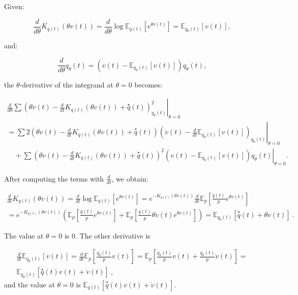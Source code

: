 \documentclass[axioms,article,submit,pdftex,moreauthors]{Definitions/mdpi}
\theoremstyle{plain}
\theoremstyle{remark}
\begin{document}
Given:

\begin{equation*} 
\frac{d}{d\theta} K_{q(t)}(\theta v(t)) = \frac{d}{d\theta} \log \mathbb{E}_{q(t)} \left[ e^{\theta v(t)} \right] = \mathbb{E}_{q_\theta(t)} [v(t)],
\end{equation*} 

and:

\begin{equation*} 
\frac{d}{d\theta} q_\theta(t) = (v(t) - \mathbb{E}_{q_\theta(t)} [v(t)]) q_\theta(t),
\end{equation*} 

the \(\theta\)-derivative of the integrand at \(\theta = 0\) becomes:

\begin{multline*}
\left. \frac{d}{d\theta} \sum \left( \theta \dot{v}(t) - \frac{d}{dt} K_{q(t)}(\theta v(t)) + \overset{\star}{q}(t) \right)^2_{q_\theta(t)} \right|_{\theta=0} \\
= \left. \sum 2 \left( \theta \dot{v}(t) - \frac{d}{dt} K_{q(t)}(\theta v(t)) + \overset{\star}{q}(t) \right) \left( \dot{v}(t) - \frac{d}{dt} \mathbb{E}_{q_\theta(t)} [v(t)] \right)_{q_\theta(t)} \right|_{\theta=0} \\
\quad + \left. \sum \left( \theta \dot{v}(t) - \frac{d}{dt} K_{q(t)}(\theta v(t)) + \overset{\star}{q}(t) \right)^2 (v(t) - \mathbb{E}_{q_\theta(t)} [v(t)]) q_\theta(t) \right|_{\theta=0}.
\end{multline*}

After computing the terms with \(\frac{d}{dt}\), we obtain:

\begin{multline*}  
    \frac{d}{dt} K_{q(t)}(\theta v(t)) = \frac{d}{dt} \log \mathbb{E}_{q(t)} \left[ e^{\theta v(t)} \right] = e^{-K_{q(t)}(\theta v(t))} \frac{d}{dt} \mathbb{E}_{p} \left[ \frac{q(t)}{p} e^{\theta v(t)} \right] \\
    = e^{-K_{q(t)}(\theta v(t))} \left( \mathbb{E}_{p} \left[ \frac{\dot{q}(t)}{p} e^{\theta v(t)} \right] + \mathbb{E}_{p} \left[ \frac{q(t)}{p} \theta \dot{v}(t) e^{\theta v(t)} \right] \right) = \mathbb{E}_{q_\theta(t)} [\overset{\star}{q}(t) + \theta \dot{v}(t)] \ .
\end{multline*}


The value at \(\theta = 0\) is 0. The other derivative is

\begin{multline*}
    \frac{d}{dt} \mathbb{E}_{q_\theta(t)} [v(t)] = \frac{d}{dt} \mathbb{E}_{p} \left[ \frac{q_\theta(t)}{p} v(t) \right] 
    = \mathbb{E}_{p} \left[ \frac{\dot{q}_\theta(t)}{p} v(t) + \frac{q_\theta(t)}{p} \dot{v}(t) \right] 
    = \\ \mathbb{E}_{q_\theta(t)} [\overset{\star}{q}(t) v(t) + \dot{v}(t)] \ ,
\end{multline*}
and the value at \(\theta = 0\) is \( \mathbb{E}_{q(t)} [\overset{\star}{q}(t) v(t) + \dot{v}(t)] \).
\end{document}
